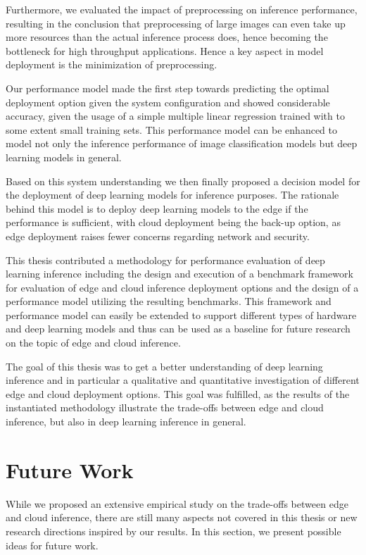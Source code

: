 Furthermore, we evaluated the impact of preprocessing on inference performance, resulting in the conclusion that preprocessing of large images can even take up more resources than the actual inference process does, hence becoming the bottleneck for high throughput applications.
Hence a key aspect in model deployment is the minimization of preprocessing.

Our performance model made the first step towards predicting the optimal deployment option given the system configuration and showed considerable accuracy, given the usage of a simple multiple linear regression trained with to some extent small training sets.
This performance model can be enhanced to model not only the inference performance of image classification models but deep learning models in general.

Based on this system understanding we then finally proposed a decision model for the deployment of deep learning models for inference purposes. The rationale behind this model is to deploy deep learning models to the edge if the performance is sufficient, with cloud deployment being the back-up option, as edge deployment raises fewer concerns regarding network and security.

This thesis contributed a methodology for performance evaluation of deep learning inference including the design and execution of a benchmark framework for evaluation of edge and cloud inference deployment options and the design of a performance model utilizing the resulting benchmarks.
This framework and performance model can easily be extended to support different types of hardware and deep learning models and thus can be used as a baseline for future research on the topic of edge and cloud inference.

The goal of this thesis was to get a better understanding of deep learning inference and in particular a qualitative and quantitative investigation of different edge and cloud deployment options.
This goal was fulfilled, as the results of the instantiated methodology illustrate the trade-offs between edge and cloud inference, but also in deep learning inference in general.



\section{Future Work}
While we proposed an extensive empirical study on the trade-offs between edge and cloud inference, there are still many aspects not covered in this thesis or new research directions inspired by our results. 
In this section, we present possible ideas for future work.

